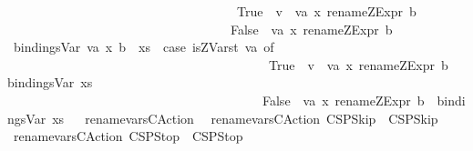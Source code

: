 \begin{isabellebody}
\ \ \ \ \ \ \ \ \ \ \ \ \ \ \ \ \ \ \ \ \ \ \ \ \ \ \ \ \ \ \ \ \ \ \ \ True\ {\isasymRightarrow}\ {\isacharbrackleft}{\isacharparenleft}{\isacharparenleft}{\isacharprime}{\isacharprime}v{\isacharunderscore}{\isacharprime}{\isacharprime}\ {\isacharat}\ va{\isacharcomma}\ x{\isacharparenright}{\isacharcomma}\ {\isacharparenleft}rename{\isacharunderscore}ZExpr\ b{\isacharparenright}{\isacharparenright}{\isacharbrackright}\isanewline
\ \ \ \ \ \ \ \ \ \ \ \ \ \ \ \ \ \ \ \ \ \ \ \ \ \ \ \ \ \ \ \ \ \ {\isacharbar}\ False\ {\isasymRightarrow}\ {\isacharbrackleft}{\isacharparenleft}{\isacharparenleft}va{\isacharcomma}\ x{\isacharparenright}{\isacharcomma}\ {\isacharparenleft}rename{\isacharunderscore}ZExpr\ b{\isacharparenright}{\isacharparenright}{\isacharbrackright}{\isacharparenright}{\isachardoublequoteclose}\isanewline
{\isacharbar}\ {\isachardoublequoteopen}bindingsVar\ {\isacharparenleft}{\isacharparenleft}{\isacharparenleft}va{\isacharcomma}\ x{\isacharparenright}{\isacharcomma}\ b{\isacharparenright}\ {\isacharhash}\ xs{\isacharparenright}\ {\isacharequal}\ {\isacharparenleft}case\ {\isacharparenleft}is{\isacharunderscore}ZVar{\isacharunderscore}st\ va{\isacharparenright}\ of\isanewline
\ \ \ \ \ \ \ \ \ \ \ \ \ \ \ \ \ \ \ \ \ \ \ \ \ \ \ \ \ \ \ \ \ \ \ \ \ \ \ \ \ True\ {\isasymRightarrow}\ {\isacharbrackleft}{\isacharparenleft}{\isacharparenleft}{\isacharprime}{\isacharprime}v{\isacharunderscore}{\isacharprime}{\isacharprime}\ {\isacharat}\ va{\isacharcomma}\ x{\isacharparenright}{\isacharcomma}\ {\isacharparenleft}rename{\isacharunderscore}ZExpr\ b{\isacharparenright}{\isacharparenright}{\isacharbrackright}\ {\isacharat}\ {\isacharparenleft}bindingsVar\ xs{\isacharparenright}\isanewline
\ \ \ \ \ \ \ \ \ \ \ \ \ \ \ \ \ \ \ \ \ \ \ \ \ \ \ \ \ \ \ \ \ \ \ \ \ \ \ {\isacharbar}\ False\ {\isasymRightarrow}\ {\isacharbrackleft}{\isacharparenleft}{\isacharparenleft}va{\isacharcomma}\ x{\isacharparenright}{\isacharcomma}\ {\isacharparenleft}rename{\isacharunderscore}ZExpr\ b{\isacharparenright}{\isacharparenright}{\isacharbrackright}\ {\isacharat}\ {\isacharparenleft}bindingsVar\ xs{\isacharparenright}{\isacharparenright}{\isachardoublequoteclose}\isanewline
\isanewline
\ \isanewline
{}\isamarkupfalse%
\ rename{\isacharunderscore}vars{\isacharunderscore}CAction\isanewline
{}\isanewline
\ \ {\isachardoublequoteopen}rename{\isacharunderscore}vars{\isacharunderscore}CAction\ CSPSkip\ {\isacharequal}\ CSPSkip{\isachardoublequoteclose}\isanewline
{\isacharbar}\ {\isachardoublequoteopen}rename{\isacharunderscore}vars{\isacharunderscore}CAction\ CSPStop\ {\isacharequal}\ CSPStop{\isachardoublequoteclose}\isanewline

\end{isabellebody}
